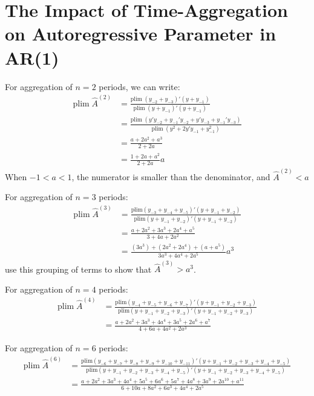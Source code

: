 
\section{The Impact of Time-Aggregation on Autoregressive Parameter in AR(1)}
For aggregation of $n = 2$ periods, we can write: 
\begin{align}
    \text{plim} \; \hat{A}^{(2)} &= \frac{\text{plim} \; (y_{-2} + y_{-3})'(y + y_{-1})}{\text{plim} \; (y + y_{-1})'(y + y_{-1})} \\
        &= \frac{\text{plim} \; (y'y_{-2} + y_{-1}'y_{-2} + y'y_{-3} + y_{-1}'y_{-3})}{\text{plim} \; (y^{2} + 2y'y_{-1} + y^{2}_{-1})}\\
        &= \frac{a + 2 a^{2} + a^{3}}{2 + 2a}\\
        &= \frac{1 + 2a + a^{2}}{2 + 2a}a
\end{align}
When $-1 < a < 1$, the numerator is smaller than the denominator, and $\hat{A}^{(2)} < a$

For aggregation of $n = 3$ periods: 
\begin{align}
    \text{plim} \; \hat{A}^{(3)} &= \frac{\text{plim} (y_{-3} + y_{-4} + y_{-5})'(y + y_{-1} + y_{-2})}{\text{plim} (y + y_{-1} + y_{-2})'(y + y_{-1} + y_{-2})}\\
        &= \frac{a + 2a^{2} + 3a^{3} + 2a^{4} + a^{5}}{3 + 4a + 2a^{2}}\\
        &= \frac{(3a^{3}) + (2a^{2} + 2a^{4}) + (a + a^{5})}{3a^{3} + 4a^{4} + 2a^{5}} a^{3}
\end{align}
\textcite{hickman_effects_1972} use this grouping of terms to show that $\hat{A}^{(3)} > a^{3}$. 

For aggregation of $n = 4$ periods: 
\begin{align}
    \text{plim} \; \hat{A}^{(4)} &= \frac{\text{plim} (y_{-4} + y_{-5} + y_{-6} + y_{-7})'(y + y_{-1} + y_{-2} + y_{-3})}{\text{plim} (y + y_{-1} + y_{-2} + y_{-3})'(y + y_{-1} + y_{-2} + y_{-3})}\\
        &= \frac{a + 2a^{2} + 3a^{3} + 4a^{4} + 3a^{5} + 2a^{6} + a^{7}}{4 + 6a + 4a^{2} + 2a^{3}}
    \end{align}
        
For aggregation of $n = 6$ periods: 
\begin{align}
    \text{plim} \; \hat{A}^{(6)} &= \frac{\text{plim} (y_{-6} + y_{-7} + y_{-8} + y_{-9} + y_{-10} + y_{-11})'(y + y_{-1} + y_{-2} + y_{-3} + y_{-4} + y_{-5})}{\text{plim} (y + y_{-1} + y_{-2} + y_{-3} + y_{-4} + y_{-5})'(y + y_{-1} + y_{-2} + y_{-3} + y_{-4} + y_{-5})}\\
        &= \frac{a + 2a^{2} + 3a^{3} + 4a^{4} + 5a^{5} + 6a^{6} + 5a^{7} + 4a^{8} + 3a^{9} + 2a^{10} + a^{11}}{6 + 10a + 8a^{2} + 6a^{3} + 4a^{4} + 2a^{5}}
\end{align}